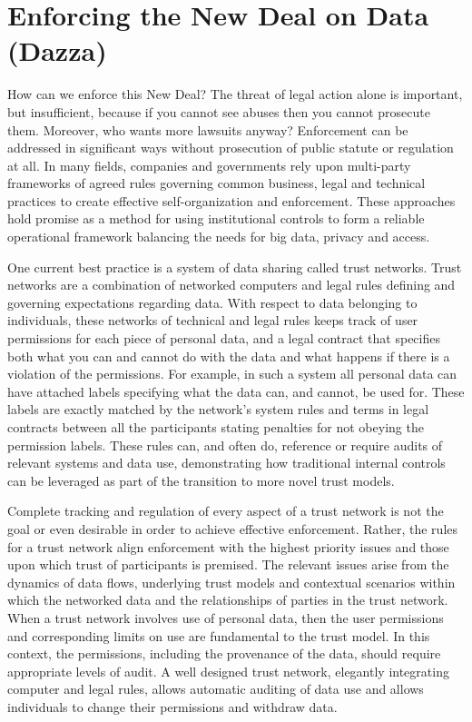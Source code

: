 \section{Enforcing the New Deal on Data (Dazza)}

How can we enforce this New Deal?
The threat of legal action alone is important, but insufficient, because if you cannot see abuses then you cannot prosecute them.
Moreover, who wants more lawsuits anyway?
Enforcement can be addressed in significant ways without prosecution of public statute or regulation at all.
In many fields, companies and governments rely upon multi-party frameworks of agreed rules governing common business, legal and technical practices to create effective self-organization and enforcement.
These approaches hold promise as a method for using institutional controls to form a reliable operational framework balancing the needs for big data, privacy and access.

One current best practice is a system of data sharing called trust networks.
Trust networks are a combination of networked computers and legal rules defining and governing expectations regarding data.
With respect to data belonging to individuals, these networks of technical and legal rules keeps track of user permissions for each piece of personal data, and a legal contract that specifies both what you can and cannot do with the data and what happens if there is a violation of the permissions.
For example, in such a system all personal data can have attached labels specifying what the data can, and cannot, be used for.
These labels are exactly matched by the network's system rules and terms in legal contracts between all the participants stating penalties for not obeying the permission labels.
These rules can, and often do, reference or require audits of relevant systems and data use, demonstrating how traditional internal controls can be leveraged as part of the transition to more novel trust models.

Complete tracking and regulation of every aspect of a trust network is not the goal or even desirable in order to achieve effective enforcement.
Rather, the rules for a trust network align enforcement with the highest priority issues and those upon which trust of participants is premised.
The relevant issues arise from the dynamics of data flows, underlying trust models and contextual scenarios within which the networked data and the relationships of parties in the trust network. 
When a trust network involves use of personal data, then the user permissions and corresponding limits on use are fundamental to the trust model.
In this context, the permissions, including the provenance of the data, should require appropriate levels of audit.
A well designed trust network, elegantly integrating computer and legal rules, allows automatic auditing of data use and allows individuals to change their permissions and withdraw data.


